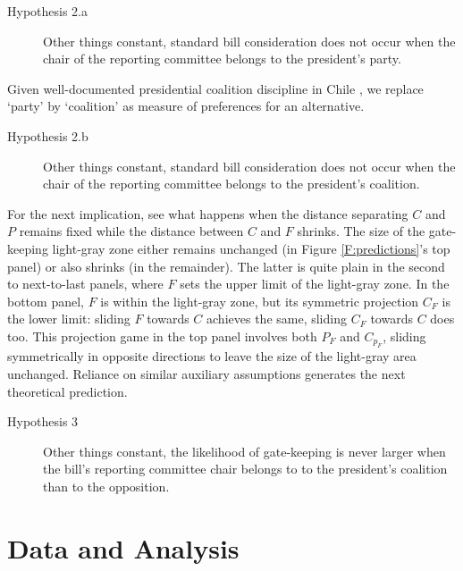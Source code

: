 \documentclass[letter,12pt]{article}
\begin{document}
\begin{description}
  \item [Hypothesis 2.a] Other things constant, standard bill consideration does not occur when the chair of the reporting committee belongs to the president's party. 
\end{description}

\noindent Given well-documented presidential coalition discipline in Chile \citep{aleman.saiegh.coalUnityChile.2007,carey.2002}, we replace `party' by `coalition' as measure of preferences for an alternative. 

\begin{description}
  \item [Hypothesis 2.b] Other things constant, standard bill consideration does not occur when the chair of the reporting committee belongs to the president's coalition. 
\end{description}

For the next implication, see what happens when the distance separating $C$ and $P$ remains fixed while the distance between $C$ and $F$ shrinks. The size of the gate-keeping light-gray zone either remains unchanged (in Figure \ref{F:predictions}'s top panel) or also shrinks (in the remainder). The latter is quite plain in the second to next-to-last panels, where $F$ sets the upper limit of the light-gray zone. In the bottom panel, $F$ is within the light-gray zone, but its symmetric projection $C_F$ is the lower limit: sliding $F$ towards $C$ achieves the same, sliding $C_F$ towards $C$ does too. This projection game in the top panel involves both $P_F$ and $C_{p_F}$, sliding symmetrically in opposite directions to leave the size of the light-gray area unchanged. Reliance on similar auxiliary assumptions generates the next theoretical prediction.

\begin{description}
  \item [Hypothesis 3] Other things constant, the likelihood of gate-keeping is never larger when the bill's reporting committee chair belongs to to the president's coalition than to the opposition. 
\end{description}

\section{Data and Analysis}
\end{document}
